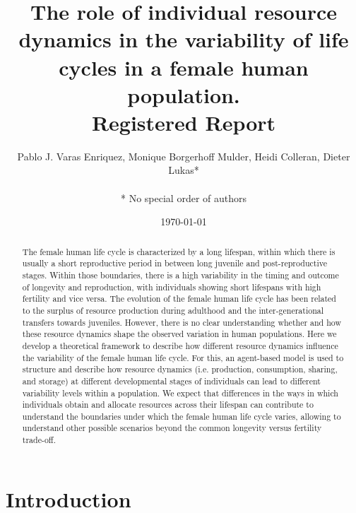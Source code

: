 \documentclass{article}
\title{The role of individual resource dynamics in the variability of life cycles in a female human population.
\\
Registered Report}
\author{Pablo J. Varas Enriquez, Monique Borgerhoff Mulder, Heidi Colleran, Dieter Lukas*\\\\
* No special order of authors}
\date{\today}
\begin{document}
\maketitle

\tableofcontents

\begin{abstract}
    The female human life cycle is characterized by a long lifespan, within which there is usually a short reproductive period in between long juvenile and post-reproductive stages. Within those boundaries, there is a high variability in the timing and outcome of longevity and reproduction, with individuals showing short lifespans with high fertility and vice versa. The evolution of the female human life cycle has been related to the surplus of resource production during adulthood and the inter-generational transfers towards juveniles. However, there is no clear understanding whether and how these resource dynamics shape the observed variation in human populations. Here we develop a theoretical framework to describe how different resource dynamics influence the variability of the female human life cycle. For this, an agent-based model is used to structure and describe how resource dynamics (i.e. production, consumption, sharing, and storage) at different developmental stages of individuals can lead to different variability levels within a population. We expect that differences in the ways in which individuals obtain and allocate resources across their lifespan can contribute to understand the boundaries under which the female human life cycle varies, allowing to understand other possible scenarios beyond the common longevity versus fertility trade-off. 
\end{abstract}

\section{Introduction}
\end{document}
